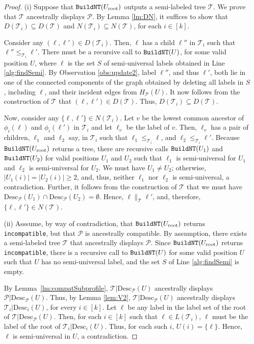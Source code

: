 \documentclass[11pt]{article}
\newcommand{\Uinit}{\ensuremath{U_\mathrm{root}}} \newcommand{\Ubef}{\ensuremath{U_\mathrm{bef}}} \newcommand{\Uaft}{\ensuremath{U_\mathrm{aft}}} \newcommand{\Urem}{\ensuremath{U_\mathrm{rem}}} \newcommand{\Yinit}{\ensuremath{Y_\mathrm{root}}} \newcommand{\Winit}{\ensuremath{W_\mathrm{root}}} \newcommand{\indeg}{\ensuremath{\mathrm{indegree}}} \newcommand{\Desc}{\ensuremath{\mathrm{Desc}}}
\newcommand{\DG}{\ensuremath{H_\P}} \newcommand{\GBNT}{\ensuremath{G_{\mathtt{BNT}}}}
\renewcommand{\P}{\ensuremath{\mathcal{P}}}
\newcommand{\T}{\ensuremath{\mathcal{T}}}
\theoremstyle{definition}
\begin{document}
\begin{proof}
(i) Suppose that $\SLBuild(\Uinit)$ outputs a semi-labeled tree $\T$.  We prove that $\T$ ancestrally displays $\P$. By Lemma \ref{lm:DN}, it suffices to show that $D(\T_i) \subseteq D(\T)$ and  $N(\T_i) \subseteq N(\T)$, for each $i \in [k]$.

Consider any $(\ell,\ell') \in D(\T_i)$.  Then, $\ell$ has a child $\ell''$ in $\T_i$ such that $\ell'' \le_{\T_i} \ell'$.  There must be a recursive call to $\texttt{BuildNT}(U)$, for some valid position $U$, where $\ell$ is the set $S$ of semi-universal labels obtained in Line \ref{alg:findSemi}.  By Observation \ref{obs:update2}, label $\ell''$, and thus $\ell'$, both lie in one of the connected components of the graph obtained by deleting all labels in $S$, including $\ell$, and their incident edges from $\DG(U)$. It now follows from the construction of $\T$ that $(\ell, \ell') \in D(\T)$.  Thus, $D(\T_i) \subseteq D(\T)$.

Now, consider any $\{\ell,\ell' \} \in N(\T_i)$.  Let $v$ be the lowest common ancestor of $\phi_i(\ell)$ and $\phi_i(\ell')$ in $\T_i$ and let $\ell_v$ be the label of $v$. Then, $\ell_v$ has a pair of children, $\ell_1$ and $\ell_2$ say, in $\T_i$ such that $\ell_1 \le_{\T_i} \ell$, and $\ell_2 \le_{\T_i} \ell'$. Because $\SLBuild(\Uinit)$ returns a tree, there are recursive calls $\texttt{BuildNT}(U_1)$ and $\texttt{BuildNT}(U_2)$ for valid positions $U_1$ and $U_2$ such that $\ell_1$ is semi-universal for $U_1$ and $\ell_2$ is semi-universal for $U_2$. We must have $U_1 \neq U_2$; otherwise, $|U_1(i)| = |U_2(i)| \ge 2$, and, thus, neither $\ell_1$ nor $\ell_2$ is semi-universal, a contradiction. Further, it follows from the construction of $\T$ that we must have $\Desc_\P(U_1) \cap \Desc_\P(U_2) = \emptyset$.  Hence, $\ell \parallel_\T \ell'$, and, therefore, $\{\ell,\ell'\} \in N(\T)$.

(ii) Asssume, by way of contradiction, that $\SLBuild(\Uinit)$ returns \texttt{incompatible}, but that $\P$ is ancestrally compatible.  By assumption, there exists a semi-labeled  tree $\T$ that ancestrally displays $\P$.  Since $\SLBuild(\Uinit)$ returns  \texttt{incompatible}, there is a recursive call to $\texttt{BuildNT}(U)$ for some valid position $U$ such that $U$ has no semi-universal label, and the set $S$ of Line \ref{alg:findSemi} is empty. 


By Lemma~\ref{lm:compatSubprofile}, $\T | \Desc_\P(U)$ ancestrally displays $\P|\Desc_\P(U)$.  Thus, by Lemma \ref{lem:V2}, $\T | \Desc_\P(U)$ ancestrally displays $\T_i | \Desc_i(U)$, for every $i \in [k]$.  Let
$\ell$ be any label in the label set of the root of $\T | \Desc_\P(U)$.  Then, for each $i \in [k]$ such that $\ell \in L(\T_{i})$, $\ell$ must be the label of the root of $\T_i|\Desc_i(U)$.
Thus, for each such $i$, $U(i) = \{\ell\}$.  Hence, $\ell$ is semi-universal in $U$, a contradiction.
\end{proof}
\end{document}
